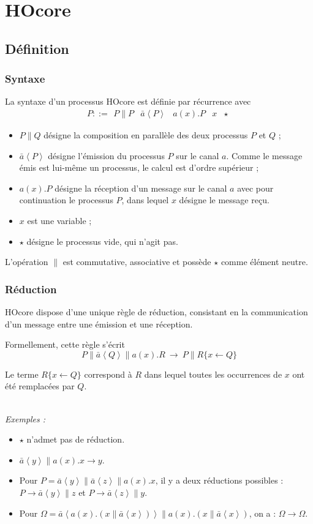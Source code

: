 \documentclass[11pt]{article}
\newcommand{\send}[2]{\bar{#1}\left\langle #2\right\rangle}
\begin{document}
\section{HOcore}
\label{sec-2}
\subsection{Définition}
\label{sec-2-1}
\subsubsection{Syntaxe}
\label{sec-2-1-1}

La syntaxe d'un processus HOcore est définie par récurrence avec
\[P::=\begin{array}{c|c|c|c|c}
P \parallel P & \send{a}P & a(x).P & x & \star
\end{array}\]
\begin{itemize}
	\item $P\parallel Q$ désigne la composition en parallèle des deux processus $P$ et $Q$ ;
	\item $\send{a}P$ désigne l'émission du processus $P$ sur le canal $a$. Comme le message émis est lui-même un processus, le calcul est d'ordre supérieur ;
	\item $a(x).P$ désigne la réception d'un message sur le canal $a$ avec pour continuation le processus $P$, dans lequel $x$ désigne le message reçu.
	\item $x$ est une variable ;
	\item $\star$ désigne le processus vide, qui n'agit pas.
\end{itemize}

L'opération $\parallel$ est commutative, associative et possède $\star$ comme élément neutre.

\subsubsection{Réduction}
\label{sec-2-1-2}

HOcore dispose d'une unique règle de réduction, consistant en la communication d'un message entre une émission et une réception.

Formellement, cette règle s'écrit
\[P\parallel \send{a}Q \parallel a(x).R\ \to\ P\parallel
R\{x\gets Q\}\]

Le terme $R\{x\gets Q\}$ correspond à $R$ dans lequel toutes les occurrences de $x$ ont été remplacées par $Q$.


\textsl{\\Exemples :}
\begin{itemize}
	\item $\star$ n'admet pas de réduction.
	\item $\send{a}y\parallel a(x).x\to y$.
	\item Pour $P = \send{a}y \parallel \send{a}z \parallel a(x).x$, il y a deux réductions possibles : $P \to \send{a}y\parallel z$ et $P \to \send{a}z \parallel y$.
	\item Pour $\Omega = \send{a}{a(x).(x\parallel \send{a}x)} \parallel a(x).(x\parallel \send{a}x)$, on a : $\Omega \to \Omega$.
\end{itemize}
\end{document}
